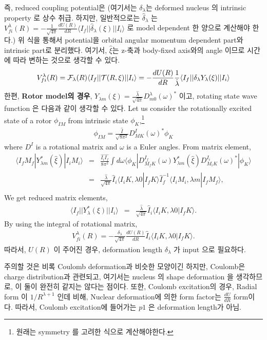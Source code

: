 \documentclass[11pt]{book}
\def\la{\langle}
\def\ra{\rangle}
\newcommand{\bea}{\begin{eqnarray}}
\newcommand{\eea}{\end{eqnarray}}
\newcommand{\no}{\nonumber \\}
\begin{document}
즉, reduced coupling potential은 (여기서는 $\delta_\lambda$는 deformed nucleus
의 intrinsic property 로 상수 취급. 하지만, 일반적으로는 $\hat{\delta}_\lambda$ 는 
$V^\lambda_{fi}(R)= -\frac{1}{\sqrt{4\pi}}\frac{dU(R)}{dR} 
\la I_f||\hat{\delta}_\lambda(\xi)|| I_i\ra$ 로 model dependent 한 양으로 
계산해야 한다.)
위 식을 통해서 potential을 orbital angular momentum dependent part와 
intrinsic part로 분리했다. 여기서, $\hat{\xi}$는 z-축과 body-fixed axis와의 
angle 이므로 시간에 따라 변하는 것으로 생각할 수 있다.  
\bea 
V_{fi}^\lambda(R)={\cal F}_\lambda(R)\la I_f|| {\cal T}(R,\xi)||I_i\ra 
                = -\frac{ d U(R)}{dR}\frac{1}{\hat{\lambda}} 
                  \la I_f|| \delta_\lambda  Y_\lambda(\xi)|| I_i\ra 
\eea 
한편, {\bf Rotor model의 경우},
$Y_{\lambda m}(\xi)=\frac{\hat{\lambda}}{\sqrt{4\pi}} D^\lambda_{m0}(\omega)^*$
이고, rotating state wave function 은 다음과 같이 생각할 수 있다.
Let us consider the rotationally excited state of a rotor $\phi_{IM}$
from intrinsic state $\phi_K$,\footnote{원래는 symmetry 를 고려한 식으로 계산해야한다. } 
\bea 
\phi_{IM}=\frac{\hat{I}}{\sqrt{8\pi^2}} D^{I}_{MK}(\omega)^* \phi_K
\eea 
where $D^I$ is a rotational matrix and $\omega$ is a Euler angles. 
From matrix element,
\bea 
\la I_f M_f|Y^*_{\lambda m}(\hat{\xi})|I_i M_i\ra 
&=&\frac{\hat{I_i}\hat{I_f}}{8\pi^2}\int d\omega 
 \la \phi_K| D^{I_f}_{M_f K}(\omega)Y^*_{\lambda m}(\hat{\xi})
            D^{I_i}_{M_i K}(\omega)^* |\phi_K\ra \no 
&=& \frac{\hat{\lambda}}{\sqrt{4\pi}}\hat{I}_i \la I_i K,\lambda 0| I_f K\ra 
    \hat{I}_f^{-1} \la I_i M_i,\lambda m| I_f M_f\ra ,\no 
\eea 
We get reduced matrix elements, 
\bea 
\la I_f || Y_\lambda^*(\xi) || I_i\ra &=& \frac{\hat{\lambda}}{\sqrt{4\pi}}
                                  \hat{I}_i \la I_i K,\lambda 0|I_f K\ra.        
\eea 
By using the integral of rotational matrix,
\bea 
V_{fi}^\lambda(R)=-\frac{\delta_\lambda}{\sqrt{4\pi}} \frac{ d U(R)}{dR} \hat{I}_i
                  \la I_i K,\lambda 0| I_f K\ra. 
\eea 
따라서, $U(R)$ 이 주어진 경우, deformation length $\delta_\lambda$ 가 input 으로 
필요하다. 

주의할 것은 비록 Coulomb deformation과 비슷한 모양이긴 하지만, 
Coulomb은 charge distribution과 관련되고, 여기서는 nucleus 의 shape deformation
을 생각하므로, 이 둘이 완전히 같지는 않다는 점이다. 
또한, Coulomb excitation의 경우, 
Radial form 이 $1/R^{\lambda+1}$ 인데 비해, Nuclear deformation에 의한 
form factor는 $\frac{dU}{dR}$ form이다. 따라서, Coulomb excitation에 들어가는 $p1$
은 deformation length가 아님. 
\end{document}
